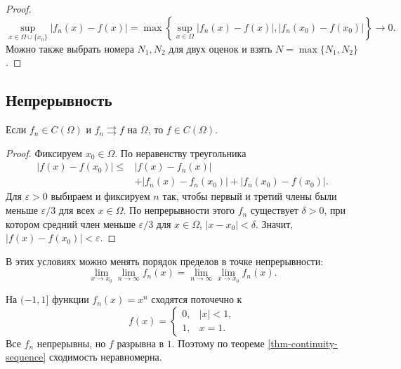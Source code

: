 \begin{proof}

\[
\sup_{x\in\Omega\cup\{x_0\}}|f_n(x)-f(x)|
=\max\left\{\sup_{x\in\Omega}|f_n(x)-f(x)|,
|f_n(x_0)-f(x_0)|\right\}\longrightarrow0.
\] Можно также выбрать номера \(N_1,N_2\) для двух оценок и взять \(N=\max\{N_1,N_2\}\).

\end{proof}

\subsection{Непрерывность}\label{sec-sequences-02-3}

\begin{theorem}\label{thm-continuity-sequence}

Если \(f_n\in C(\Omega)\) и \(f_n\rightrightarrows f\) на \(\Omega\), то \(f\in C(\Omega)\).

\end{theorem}

\begin{proof}

Фиксируем \(x_0\in\Omega\). По неравенству треугольника \[
\begin{aligned}
|f(x)-f(x_0)|\le{}&|f(x)-f_n(x)|\\
&+|f_n(x)-f_n(x_0)|+|f_n(x_0)-f(x_0)|.
\end{aligned}
\] Для \(\varepsilon>0\) выбираем и фиксируем \(n\) так, чтобы первый и третий члены были меньше \(\varepsilon/3\) для всех \(x\in\Omega\). По непрерывности этого \(f_n\) существует \(\delta>0\), при котором средний член меньше \(\varepsilon/3\) для \(x\in\Omega\), \(|x-x_0|<\delta\). Значит, \(|f(x)-f(x_0)|<\varepsilon\).

\end{proof}

В этих условиях можно менять порядок пределов в точке непрерывности: \[
\lim_{x\to x_0}\lim_{n\to\infty}f_n(x)
=\lim_{n\to\infty}\lim_{x\to x_0}f_n(x).
\]

\begin{example}\label{exm-powers-nonuniform}

На \((-1,1]\) функции \(f_n(x)=x^n\) сходятся поточечно к \[
f(x)=\begin{cases}0,&|x|<1,\\1,&x=1.\end{cases}
\] Все \(f_n\) непрерывны, но \(f\) разрывна в \(1\). Поэтому по теореме \ref{thm-continuity-sequence} сходимость неравномерна.

\end{example}

